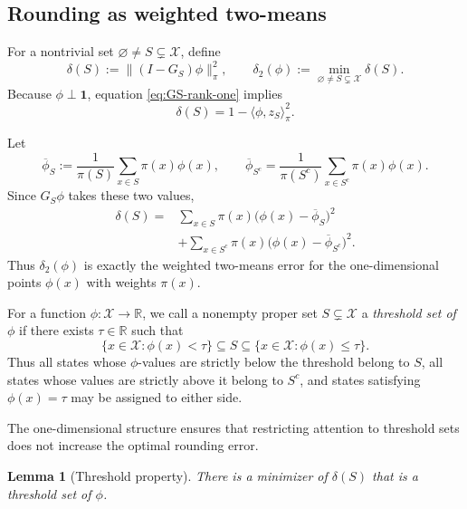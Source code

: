 \documentclass[11pt]{article}
\newtheorem{lemma}[theorem]{Lemma}
\newcommand{\1}{\mathbf{1}}
\newcommand{\X}{\mathcal{X}}
\begin{document}
\subsection{Rounding as weighted two-means}

For a nontrivial set $\varnothing\neq S\subsetneq\X$, define
\begin{equation}
    \delta(S):=\|(I-G_S)\phi\|_\pi^2,
    \qquad
    \delta_2(\phi):=
      \min_{\varnothing\neq S\subsetneq\X}\delta(S).
    \label{eq:delta-two}
\end{equation}
Because $\phi\perp\1$, equation \eqref{eq:GS-rank-one} implies
\begin{equation*}
    \delta(S)
    =1-\langle\phi,z_S\rangle_\pi^2.
\end{equation*}

Let
\[
    \overline\phi_S
    :=\frac{1}{\pi(S)}\sum_{x\in S}\pi(x)\phi(x),
    \qquad
    \overline\phi_{S^c}
    =\frac{1}{\pi(S^c)}\sum_{x\in S^c}\pi(x)\phi(x).
\]
Since $G_S\phi$ takes these two values,
\begin{equation}
\begin{split}
    \delta(S)
    ={}&\sum_{x\in S}\pi(x)
        \bigl(\phi(x)-\overline\phi_S\bigr)^2\\
       &+\sum_{x\in S^c}\pi(x)
        \bigl(\phi(x)-\overline\phi_{S^c}\bigr)^2.
\end{split}
    \label{eq:weighted-two-means}
\end{equation}
Thus $\delta_2(\phi)$ is exactly the weighted two-means error for the
one-dimensional points $\phi(x)$ with weights $\pi(x)$.

For a function $\phi:\X\to\mathbb R$, we call a nonempty proper set
$S\subsetneq\X$ a \emph{threshold set of $\phi$} if there exists
$\tau\in\mathbb R$ such that
\begin{equation*}
	\{x\in\X:\phi(x)<\tau\}
	\subseteq S
	\subseteq
	\{x\in\X:\phi(x)\leq\tau\}.
\end{equation*}
Thus all states whose $\phi$-values are strictly below the threshold
belong to $S$, all states whose values are strictly above it belong to
$S^c$, and states satisfying $\phi(x)=\tau$ may be assigned to either
side.

The one-dimensional structure ensures that restricting attention to
threshold sets does not increase the optimal rounding error.

\begin{lemma}[Threshold property]
\label{lem:threshold-property}
There is a minimizer of $\delta(S)$ that is a threshold set of $\phi$.
\end{lemma}
\end{document}

